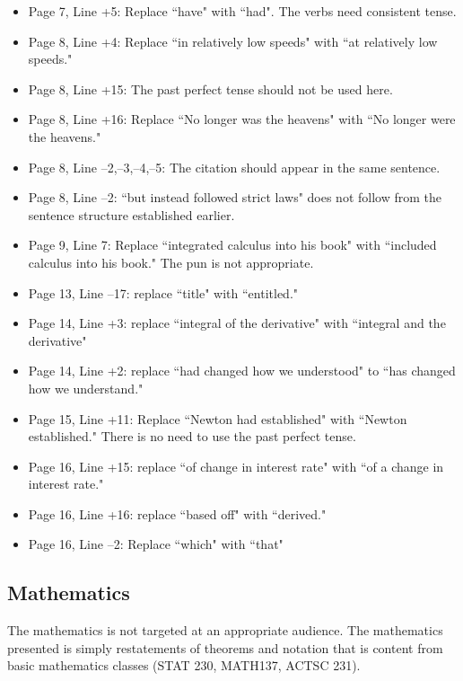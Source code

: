 \documentclass[11pt]{article}
\begin{document}
\begin{itemize}
\begin{itemize}
		\item Page 7, Line +5: Replace ``have" with ``had". The verbs need consistent tense.
		\item Page 8, Line +4: Replace ``in relatively low speeds" with ``at relatively low speeds."
		\item Page 8, Line +15: The past perfect tense should not be used here.
		\item Page 8, Line +16: Replace ``No longer was the heavens" with ``No longer were the heavens."
		\item Page 8, Line --2,--3,--4,--5: The citation should appear in the same sentence.
		\item Page 8, Line --2: ``but instead followed strict laws" does not follow from the sentence structure established earlier. 
		\item Page 9, Line 7: Replace ``integrated calculus into his book" with ``included calculus into his book." The pun is not appropriate. 
		\item Page 13, Line --17: replace ``title" with ``entitled." 
		\item Page 14, Line +3: replace ``integral of the derivative" with ``integral and the derivative"
		\item Page 14, Line +2: replace ``had changed how we understood" to ``has changed how we understand." 
		\item Page 15, Line +11: Replace ``Newton had established" with ``Newton established." There is no need to use the past perfect tense. 
		\item Page 16, Line +15: replace ``of change in interest rate" with ``of a change in interest rate." 
		\item Page 16, Line +16: replace ``based off" with ``derived."
		\item Page 16, Line --2: Replace ``which" with ``that"		
		
		
	\end{itemize}
\end{itemize}

\subsection*{Mathematics}

The mathematics is not targeted at an appropriate audience. The mathematics presented is simply restatements of theorems and notation that is content from basic mathematics classes (STAT 230, MATH137, ACTSC 231). 
\end{document}
